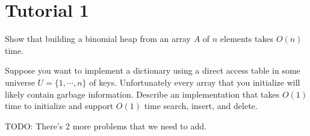 \section{Tutorial 1}
\begin{problem}
Show that building a binomial heap from an array $A$ of $n$ elements takes $O(n)$ time. 
\end{problem}

\begin{problem}
Suppose you want to implement a dictionary using a direct access table in some universe $U = \{ 1, \cdots, n \}$ of keys. Unfortunately every array that you initialize will likely contain garbage information. Describe an implementation that takes $O(1)$ time to initialize and support $O(1)$ time search, insert, and delete.
\end{problem}

TODO: There's 2 more problems that we need to add.
